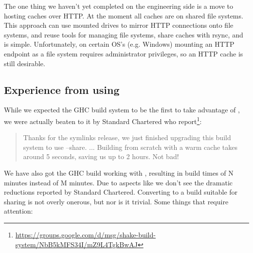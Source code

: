 {The one thing we haven't yet completed on the engineering side is a move to hosting caches over HTTP. At the moment all caches are on shared file systems. This approach can use mounted drives to mirror HTTP connections onto file systems, and reuse tools for managing file systems, share caches with rsync, and is simple. Unfortunately, on certain OS's (e.g. Windows) mounting an HTTP endpoint as a file system requires administrator privileges, so an HTTP cache is still desirable.

\subsection{Experience from using \Cloud \Shake}\label{sec-using-cloud-shake}

While we expected the GHC build system to be the first to take advantage of \Cloud \Shake, we were actually beaten to it by Standard Chartered who report\footnote{\url{https://groups.google.com/d/msg/shake-build-system/NbB5kMFS34I/mZ9L4TgkBwAJ}}:

\begin{quote}
Thanks for the symlinks release, we just finished upgrading this build system to use --share. ...
Building from scratch with a warm cache takes around 5 seconds, saving us up to 2 hours. Not bad!
\end{quote}

We have also got the GHC build working with \Cloud \Shake, resulting in build times of N minutes instead of M minutes. Due to aspects like  we don't see the dramatic reductions reported by Standard Chartered. Converting to a build suitable for sharing is not overly onerous, but nor is it trivial. Some things that require attention:

}
